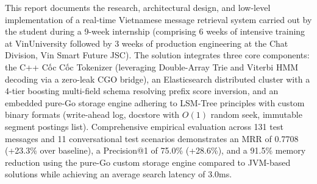 \documentclass[12pt,a4paper,oneside]{report}
\begin{document}
This report documents the research, architectural design, and low-level implementation of a real-time Vietnamese message retrieval system carried out by the student during a 9-week internship (comprising 6 weeks of intensive training at VinUniversity followed by 3 weeks of production engineering at the Chat Division, Vin Smart Future JSC). The solution integrates three core components: the C++ Cốc Cốc Tokenizer (leveraging Double-Array Trie and Viterbi HMM decoding via a zero-leak CGO bridge), an Elasticsearch distributed cluster with a 4-tier boosting multi-field schema resolving prefix score inversion, and an embedded pure-Go storage engine adhering to LSM-Tree principles with custom binary formats (write-ahead log, docstore with $O(1)$ random seek, immutable segment postings list). Comprehensive empirical evaluation across 131 test messages and 11 conversational test scenarios demonstrates an MRR of 0.7708 (+23.3\% over baseline), a Precision@1 of 75.0\% (+28.6\%), and a 91.5\% memory reduction using the pure-Go custom storage engine compared to JVM-based solutions while achieving an average search latency of 3.0ms.

\newpage
\end{document}
